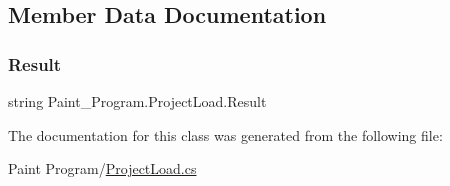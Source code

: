 \subsection{Member Data Documentation}
\mbox{\label{class_paint___program_1_1_project_load_a9db3022290634d4c0c7fad302d03eaba}} 
\subsubsection{\texorpdfstring{Result}{Result}}
{\footnotesize\ttfamily string Paint\+\_\+\+Program.\+Project\+Load.\+Result\hspace{0.3cm}{\ttfamily [private]}}



The documentation for this class was generated from the following file\+:\begin{DoxyCompactItemize}
\item 
Paint Program/\mbox{\hyperlink{_project_load_8cs}{Project\+Load.\+cs}}\end{DoxyCompactItemize}
